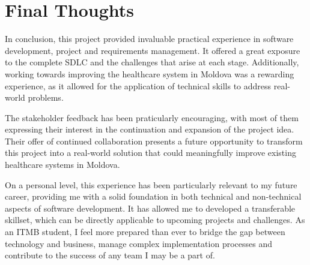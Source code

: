 \clearpage

\section{Final Thoughts}

In conclusion, this project provided invaluable practical experience in software development, project and requirements management. It offered a great exposure to the complete SDLC and the challenges that arise at each stage. Additionally, working towards improving the healthcare system in Moldova was a rewarding experience, as it allowed for the application of technical skills to address real-world problems. 

The stakeholder feedback has been praticularly encouraging, with most of them expressing their interest in the continuation and expansion of the project idea. Their offer of continued collaboration presents a future opportunity to transform this project into a real-world solution that could meaningfully improve existing healthcare systems in Moldova.

On a personal level, this experience has been particularly relevant to my future career, providing me with a solid foundation in both technical and non-technical aspects of software development. It has allowed me to developed a transferable skillset, which can be directly applicable to upcoming projects and challenges. As an ITMB student, I feel more prepared than ever to bridge the gap between technology and business, manage complex implementation processes and contribute to the success of any team I may be a part of. 